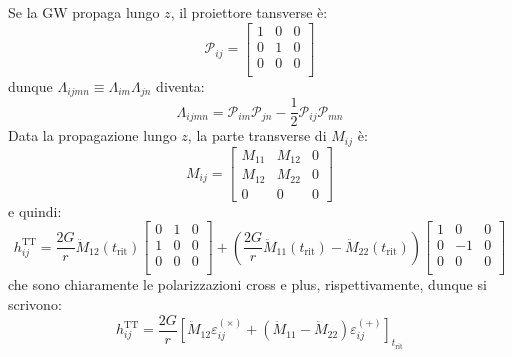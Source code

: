 \begin{example}{}{}
  Se la GW propaga lungo $ z $, il proiettore tansverse è:
  \begin{equation*}
    \mathcal{P}_{ij} =
    \begin{bmatrix}
      1 & 0 & 0 \\
      0 & 1 & 0 \\
      0 & 0 & 0 \\
    \end{bmatrix}
  \end{equation*}
  dunque $ \Lambda_{ijmn} \equiv \Lambda_{im} \Lambda_{jn} $ diventa:
  \begin{equation*}
    \Lambda_{ijmn} = \mathcal{P}_{im} \mathcal{P}_{jn} - \frac{1}{2} \mathcal{P}_{ij} \mathcal{P}_{mn}
  \end{equation*}
  Data la propagazione lungo $ z $, la parte transverse di $ M_{ij} $ è:
  \begin{equation*}
    M_{ij} =
    \begin{bmatrix}
      M_{11} & M_{12} & 0 \\
      M_{12} & M_{22} & 0 \\
      0 & 0 & 0
    \end{bmatrix}
  \end{equation*}
  e quindi:
  \begin{equation*}
    h_{ij}^\text{TT} = \frac{2G}{r} \ddot{M}_{12}(t_\text{rit})
    \begin{bmatrix}
      0 & 1 & 0 \\
      1 & 0 & 0 \\
      0 & 0 & 0 \\
    \end{bmatrix}
    + (\frac{2G}{r} \ddot{M}_{11}(t_\text{rit}) - \ddot{M}_{22}(t_\text{rit}))
    \begin{bmatrix}
      1 & 0 & 0 \\
      0 & -1 & 0 \\
      0 & 0 & 0 \\
    \end{bmatrix}
  \end{equation*}
  che sono chiaramente le polarizzazioni cross e plus, rispettivamente, dunque si scrivono:
  \begin{equation}
    h_{ij}^\text{TT} = \frac{2G}{r} \left[ \ddot{M}_{12} \varepsilon_{ij}^{(\times)} + (\ddot{M}_{11} - \ddot{M}_{22}) \varepsilon_{ij}^{(+)} \right]_{t_\text{rit}}
  \end{equation}
\end{example}

